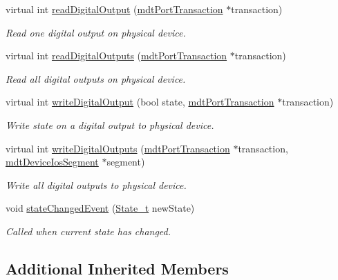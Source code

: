 \begin{DoxyCompactItemize}
virtual int \hyperlink{classmdt_multi_io_device_a74c7327f8540104d694a614b0af8929a}{read\-Digital\-Output} (\hyperlink{classmdt_port_transaction}{mdt\-Port\-Transaction} $\ast$transaction)
\begin{DoxyCompactList}\small\item\em Read one digital output on physical device. \end{DoxyCompactList}\item 
virtual int \hyperlink{classmdt_multi_io_device_ac372088c21c7077f1b71e473048eb6c8}{read\-Digital\-Outputs} (\hyperlink{classmdt_port_transaction}{mdt\-Port\-Transaction} $\ast$transaction)
\begin{DoxyCompactList}\small\item\em Read all digital outputs on physical device. \end{DoxyCompactList}\item 
virtual int \hyperlink{classmdt_multi_io_device_a80b4c2864d3e2844fe12444de243365a}{write\-Digital\-Output} (bool state, \hyperlink{classmdt_port_transaction}{mdt\-Port\-Transaction} $\ast$transaction)
\begin{DoxyCompactList}\small\item\em Write state on a digital output to physical device. \end{DoxyCompactList}\item 
virtual int \hyperlink{classmdt_multi_io_device_a03aedb552abcc344b1545d95f261e387}{write\-Digital\-Outputs} (\hyperlink{classmdt_port_transaction}{mdt\-Port\-Transaction} $\ast$transaction, \hyperlink{classmdt_device_ios_segment}{mdt\-Device\-Ios\-Segment} $\ast$segment)
\begin{DoxyCompactList}\small\item\em Write all digital outputs to physical device. \end{DoxyCompactList}\item 
void \hyperlink{classmdt_multi_io_device_ae2cc456c53e1b5f792b9073ad15bb1b3}{state\-Changed\-Event} (\hyperlink{classmdt_device_a8bcf508fbd38a8f0b235e8a9b00319f6}{State\-\_\-t} new\-State)
\begin{DoxyCompactList}\small\item\em Called when current state has changed. \end{DoxyCompactList}\end{DoxyCompactItemize}
\subsection*{Additional Inherited Members}



